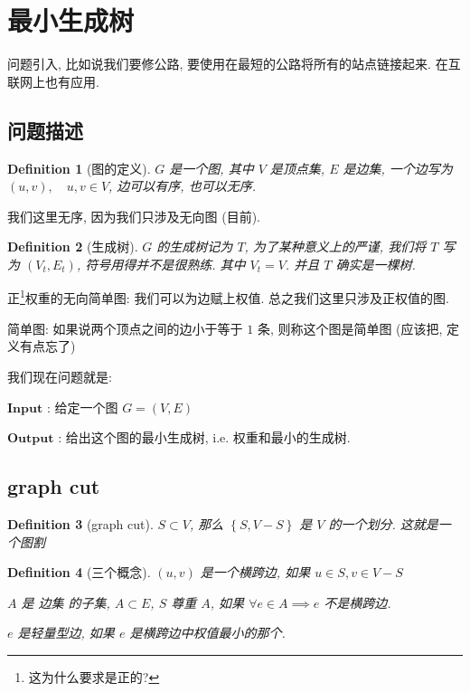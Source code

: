 \documentclass[a4paper, 10pt]{ctexart} %
\newtheorem{definition}{Definition}
\begin{document}
\section{最小生成树}
问题引入, 比如说我们要修公路, 要使用在最短的公路将所有的站点链接起来. 
在互联网上也有应用.

\subsection{问题描述}
\begin{definition}[图的定义]
$G$ 是一个图, 其中 $V$ 是顶点集, $E$ 是边集, 一个边写为 $\left(u ,v\right), \quad u, v\in V$, 边可以有序, 也可以无序. 
\end{definition}
我们这里无序, 因为我们只涉及无向图 (目前).

\begin{definition}[生成树]
$G$ 的生成树记为 $T$, 为了某种意义上的严谨, 我们将 $T$ 写为 $\left(V_{t}, E_{t}\right)$, 符号用得并不是很熟练. 其中 $V_{t} = V$. 并且 $T$ 确实是一棵树. 
\end{definition}

正\footnote{这为什么要求是正的?}权重的无向简单图: 
我们可以为边赋上权值. 总之我们这里只涉及正权值的图. 

简单图: 如果说两个顶点之间的边小于等于 $1$ 条, 则称这个图是简单图 (应该把, 定义有点忘了)

我们现在问题就是:

$\mathbf{Input}$ : 给定一个图 $G = \left(V ,E\right)$

$\mathbf {Output}$ : 给出这个图的最小生成树, i.e. 权重和最小的生成树.
\subsection{graph cut}
\begin{definition}[graph cut]
    $S \subset V$, 那么 $\left\{ S , V- S\right\}$ 是 $V$ 的一个划分. 这就是一个图割
\end{definition}
\begin{definition}[三个概念]
    $(u,v)$ 是一个横跨边, 如果 $u \in S,v \in V-S$ 

    $A$ 是 边集 的子集, $A \subset E$, $S$ 尊重 $A$, 如果 $\forall  e \in A \implies e$ 不是横跨边. 

    $e$ 是轻量型边, 如果 $e$ 是横跨边中权值最小的那个.
\end{definition}
\end{document}
